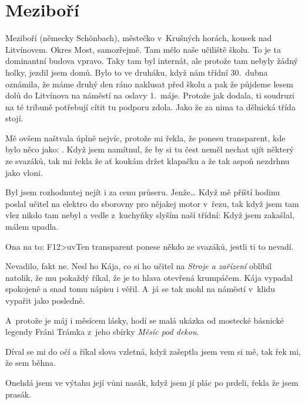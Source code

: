 

\chapter{Meziboří}


Meziboří (německy Schönbach), městečko v~Krušných horách, kousek nad
Litvínovem. Okres Most, samozřejmě. Tam mělo naše učiliště školu. To je ta
dominantní budova vpravo. Taky tam byl internát, ale protože tam nebyly žádný
holky, jezdil jsem domů. Bylo to ve druháku, když nám třídní 30.~dubna
oznámila, že máme druhý den ráno naklusat před školu a pak že půjdeme lesem
dolů do Litvínova na náměstí na oslavy 1.~máje. Protože jak dodala, ti soudruzi
na té tribuně potřebují cítit tu podporu zdola. Jako že za nima ta dělnická
třída stojí.

Mě ovšem naštvala úplně nejvíc, protože mi řekla, že ponesu transparent, kde
bylo něco jako: .
Když jsem namítnul, že by si tu čest neměl nechat ujít některý ze svazáků, tak
mi řekla že ať koukám držet klapačku a že tak aspoň nezdrhnu jako vloni.

Byl
jsem rozhodnutej nejít i za cenu průseru. Jenže\dots{} Když mě příští hodinu poslal
učitel na elektro do sborovny pro nějakej motor v~řezu, tak když jsem tam vlez
nikdo tam nebyl a vedle z~kuchyňky slyším naší třídní:  Když jsem zakašlal, málem upadla.

 Ona na to: \<F12>uv{Ten
transparent ponese někdo ze svazáků, jestli ti to nevadí.}

Nevadilo, fakt ne. Nesl ho Kája, co si ho učitel na {\em Stroje a zařízení}
oblíbil natolik, že mu pokaždý říkal, že je to hlava otevřená krumpáčem. Kája
vypadal spokojeně a snad tomu nápisu i věřil. A~já se tak mohl na náměstí
v~klidu vypařit jako posledně.

A~protože je máj i měsícem lásky, hodí se malá ukázka od mostecké
básnické legendy Fráni Trámka z~jeho sbírky {\em Měsíc pod dekou}.

\blank[1em]

\no Díval se mi do očí \crlf
a říkal slova vzletná, \crlf
když zašeptla jsem vem si mě, \crlf
tak řek mi, že sem běhna. \crlf

\no Onehdá jsem ve výtahu \crlf
její vůni nasák, \crlf
když jsem jí plác po prdeli, \crlf
řekla že jsem prasák. \crlf

